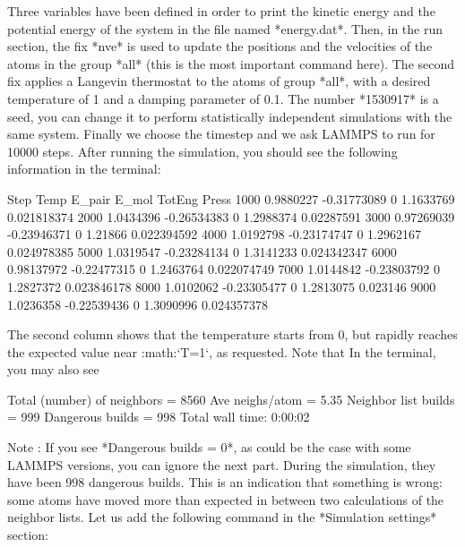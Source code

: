 Three variables have been defined in order
to print the kinetic energy and the potential energy 
of the system in the file named *energy.dat*. Then,
in the run section, the fix *nve* is used to update the
positions and the velocities of the atoms in the group
*all* (this is the most important command here). The second
fix applies a Langevin thermostat to the atoms of group
*all*, with a desired temperature of 1 and a damping
parameter of 0.1. The number *1530917* is a seed, you can
change it to perform statistically independent simulations
with the same system. Finally we choose the timestep
and we ask LAMMPS to run for 10000 steps. After running
the simulation, you should see the following information in
the terminal:



\begin{lcverbatim}
Step         Temp       E_pair        E_mol       TotEng        Press
1000    0.9880227  -0.31773089            0    1.1633769  0.021818374 
2000    1.0434396  -0.26534383            0    1.2988374   0.02287591 
3000   0.97269039  -0.23946371            0      1.21866  0.022394592 
4000    1.0192798  -0.23174747            0    1.2962167  0.024978385 
5000    1.0319547  -0.23284134            0    1.3141233  0.024342347 
6000   0.98137972  -0.22477315            0    1.2463764  0.022074749 
7000    1.0144842  -0.23803792            0    1.2827372  0.023846178 
8000    1.0102062  -0.23305477            0    1.2813075     0.023146 
9000    1.0236358  -0.22539436            0    1.3090996  0.024357378 
\end{lcverbatim}

The second column shows that the temperature
starts from 0, but rapidly reaches the
expected value near :math:`T=1`, as requested. 
Note that  In the terminal, you may also see



\begin{lcverbatim}
Total (number) of neighbors = 8560
Ave neighs/atom = 5.35
Neighbor list builds = 999
Dangerous builds = 998
Total wall time: 0:00:02
\end{lcverbatim}

Note : If you see *Dangerous builds = 0*, as could be
the case with some LAMMPS versions, you can ignore
the next part.
During the simulation, they have been 998 dangerous builds.
This is an indication that something is wrong: some atoms
have moved more than expected in between two calculations of
the neighbor lists. Let us add the following command in the
*Simulation settings* section:



